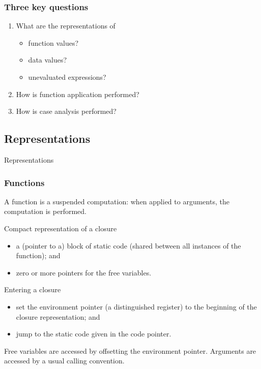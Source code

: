 \documentclass{beamer}
\begin{document}
\begin{frame}
    \frametitle{Three key questions}

    \begin{enumerate}
        \item What are the representations of
            \begin{itemize}
                \item function values?
                \item data values?
                \item unevaluated expressions?
            \end{itemize}

        \item How is function application performed?

        \item How is case analysis performed?
    \end{enumerate}
\end{frame}

\subsection{Representations}

\begin{frame}
    \huge{Representations}
\end{frame}

\begin{frame}
    \frametitle{Functions}

    A function is a suspended computation: when applied to arguments, the
    computation is performed.

    \begin{block}{Compact representation of a closure}
        \begin{itemize}
            \item
                a (pointer to a) block of \alert{static code} (shared between
                all instances of the function); and
            \item
                zero or more pointers for the \alert{free variables}.
        \end{itemize}
    \end{block}


    \begin{block}{Entering a closure}
        \begin{itemize}
            \item
                set the \alert{environment pointer} (a distinguished register)
                to the beginning of the closure representation; and
            \item
                jump to the static code given in the code pointer.
        \end{itemize}
        Free variables are accessed by offsetting the environment pointer.
        Arguments are accessed by a usual calling convention.
    \end{block}
\end{frame}
\end{document}
